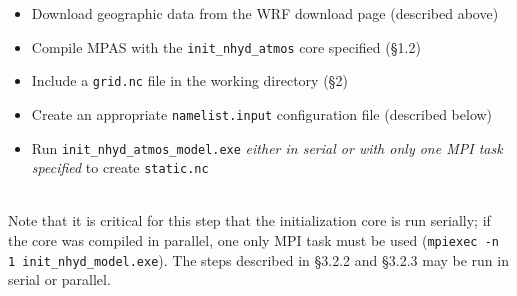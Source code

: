 \documentclass[11pt]{report}
\begin{document}
\begin{itemize}
\item Download geographic data from the WRF download page (described above) 
\item Compile MPAS with the {\tt init\_nhyd\_atmos} core specified (\S 1.2)
\item Include a {\tt grid.nc} file in the working directory (\S 2)
\item Create an appropriate {\tt namelist.input} configuration file (described below)
\item Run {\tt init\_nhyd\_atmos\_model.exe} {\em either in serial or with only one MPI task specified} to create {\tt static.nc}
\end{itemize}~\\
Note that it is critical for this step that the initialization core is run serially; if the core was compiled in parallel, one only MPI task must be used ({\tt mpiexec -n 1 init\_nhyd\_model.exe}).  The steps described in \S 3.2.2 and \S 3.2.3 may be run in serial or parallel.
\end{document}
